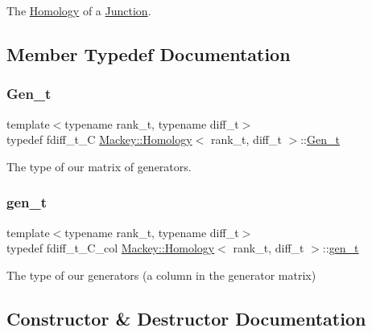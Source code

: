 The \hyperlink{classMackey_1_1Homology}{Homology} of a \hyperlink{classMackey_1_1Junction}{Junction}. 

\subsection{Member Typedef Documentation}
\mbox{\label{classMackey_1_1Homology_a9a8e354083ac094720820a5ff6bcff03}} 
\subsubsection{\texorpdfstring{Gen\+\_\+t}{Gen\_t}}
{\footnotesize\ttfamily template$<$typename rank\+\_\+t, typename diff\+\_\+t$>$ \\
typedef fdiff\+\_\+t\+\_\+C \hyperlink{classMackey_1_1Homology}{Mackey\+::\+Homology}$<$ rank\+\_\+t, diff\+\_\+t $>$\+::\hyperlink{classMackey_1_1Homology_a9a8e354083ac094720820a5ff6bcff03}{Gen\+\_\+t}}



The type of our matrix of generators. 

\mbox{\label{classMackey_1_1Homology_adf81f4293a5feba94aa734fcc8c89a46}} 
\subsubsection{\texorpdfstring{gen\+\_\+t}{gen\_t}}
{\footnotesize\ttfamily template$<$typename rank\+\_\+t, typename diff\+\_\+t$>$ \\
typedef fdiff\+\_\+t\+\_\+\+C\+\_\+col \hyperlink{classMackey_1_1Homology}{Mackey\+::\+Homology}$<$ rank\+\_\+t, diff\+\_\+t $>$\+::\hyperlink{classMackey_1_1Homology_adf81f4293a5feba94aa734fcc8c89a46}{gen\+\_\+t}}



The type of our generators (a column in the generator matrix) 



\subsection{Constructor \& Destructor Documentation}
\mbox{\label{classMackey_1_1Homology_a3580b194f986bd59a02fb84db97e00f2}} 
